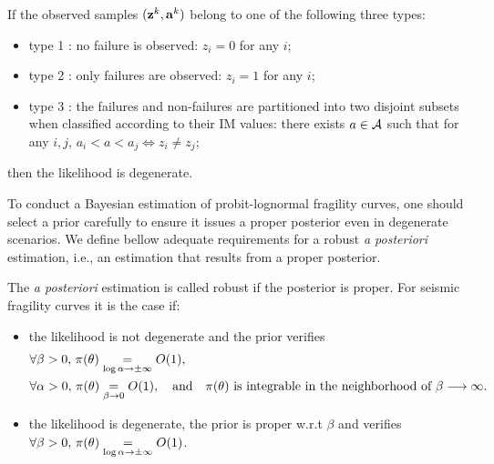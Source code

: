 \begin{defi}\label{def:doe:degeneracy}
    If the observed samples $(\mathbf{z}^k,\mathbf{a}^k)$ belong to one of the following three types:
    \begin{itemize}
        \item
        type 1 : no failure is observed: $z_i=0$ for any $i$;
        \item type 2 : only failures are observed: $z_i=1$ for any $i$;
        \item type 3 : the failures and non-failures are partitioned into two disjoint subsets when classified according to their IM values:
        there exists $a\in\mathcal{A}$ such that for any $i,j$, $a_i<a<a_j\Longleftrightarrow z_i\ne z_j$; %
    \end{itemize}
    then the likelihood is degenerate.
\end{defi}




To conduct a Bayesian estimation of probit-lognormal fragility curves, one should select a prior carefully to ensure it issues a proper posterior even in degenerate scenarios. We define bellow adequate requirements for a robust \emph{a posteriori} estimation, i.e., an estimation that results from a proper posterior.

\begin{defi}\label{def:doe:robust-estimation}
    The \emph{a posteriori} estimation is called robust if the posterior is proper. For  seismic fragility curves it is the case if:
    \begin{itemize}
        \item the likelihood is not degenerate and the prior verifies
            \begin{align*}
                &\forall\beta>0,\,\pi(\theta)\overset{}{\underset{\log\alpha\rightarrow\pm\infty}{=}}O(1),\\
                & \forall\alpha>0,\,\pi(\theta)\overset{}{\underset{\beta\rightarrow0}{=}} O(1),\quad\text{and}\quad \pi(\theta)\ \text{is integrable in the neighborhood of $\beta\longrightarrow\infty$.}
            \end{align*}
        \item the likelihood is degenerate, the prior is proper w.r.t $\beta$ and verifies $\forall\beta>0,\, \pi(\theta)\overset{}{\underset{\log\alpha\rightarrow\pm\infty}{=}}O(1)$.
    \end{itemize}
\end{defi}


